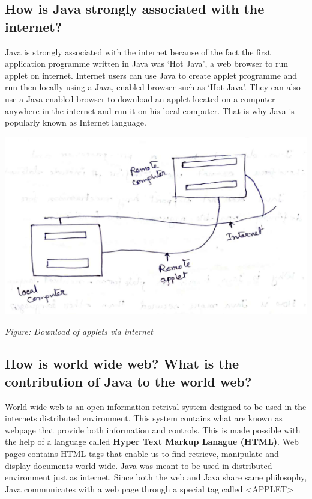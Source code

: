 \documentclass[11pt, a4paper]{book}
\begin{document}
    \subsection{How is Java strongly associated with the internet?}
      Java is strongly associated with the internet because of the fact the first application programme written in Java was `Hot Java', a web browser to run applet on internet. Internet users can use Java to create applet programme and run then locally using a Java, enabled browser such as `Hot Java'.
      They can also use a Java enabled browser to download an applet located on a computer anywhere in the internet and run it on his local computer. That is why Java is popularly known as Internet language.
  
      \includegraphics{q4diagram1}
  
      \begin{center}
        \small \textit{Figure: Download of applets via internet}\normalsize 
      \end{center}
    
    \subsection{How is world wide web? What is the contribution of Java to the world web?}
      World wide web is an open information retrival system designed to be used in the internets distributed environment. This system contains what are known as webpage that provide both information and controls. This is made possible with the help of a language called \textbf{Hyper Text Markup Lanague
      (HTML)}. Web pages contains HTML tags that enable us to find retrieve, manipulate and display documents world wide. Java was meant to be used in distributed environment just as internet. Since both the web and Java share same philosophy, Java communicates with a web page through a special tag
      called <APPLET>
    
\end{document}
